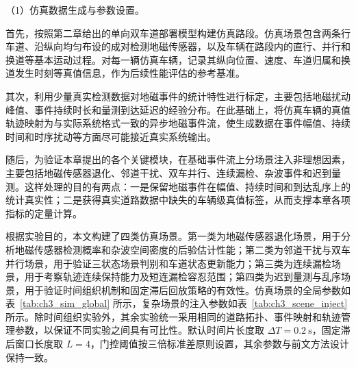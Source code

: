 \documentclass{xdupgthesis}
\begin{document}
\noindent （1）仿真数据生成与参数设置。

首先，按照第二章给出的单向双车道部署模型构建仿真路段。仿真场景包含两条行车道、沿纵向均匀布设的成对检测地磁传感器，以及车辆在路段内的直行、并行和换道等基本运动过程。对每一辆仿真车辆，记录其纵向位置、速度、车道归属和换道发生时刻等真值信息，作为后续性能评估的参考基准。

其次，利用少量真实检测数据对地磁事件的统计特性进行标定，主要包括地磁扰动峰值、事件持续时长和量测到达延迟的经验分布。在此基础上，将仿真车辆的真值轨迹映射为与实际系统格式一致的异步地磁事件流，使生成数据在事件幅值、持续时间和时序扰动等方面尽可能接近真实系统输出。

随后，为验证本章提出的各个关键模块，在基础事件流上分场景注入非理想因素，主要包括地磁传感器退化、邻道干扰、双车并行、连续漏检、杂波事件和迟到量测。这样处理的目的有两点：一是保留地磁事件在幅值、持续时间和到达乱序上的统计真实性；二是获得真实道路数据中缺失的车辆级真值标签，从而支撑本章各项指标的定量计算。

根据实验目的，本文构建了四类仿真场景。第一类为地磁传感器退化场景，用于分析地磁传感器检测概率和杂波空间密度的后验估计性能；第二类为邻道干扰与双车并行场景，用于验证三状态场景判别和车道状态更新能力；第三类为连续漏检场景，用于考察轨迹连续保持能力及短连漏检容忍范围；第四类为迟到量测与乱序场景，用于验证时间组织机制和固定滞后回放策略的有效性。仿真场景的全局参数如表~\ref{tab:ch3_sim_global} 所示，复杂场景的注入参数如表~\ref{tab:ch3_scene_inject} 所示。除时间组织实验外，其余实验统一采用相同的道路拓扑、事件映射和轨迹管理参数，以保证不同实验之间具有可比性。默认时间片长度取 $\Delta T=0.2\ \mathrm{s}$，固定滞后窗口长度取 $L=4$，门控阈值按三倍标准差原则设置，其余参数与前文方法设计保持一致。
\end{document}
